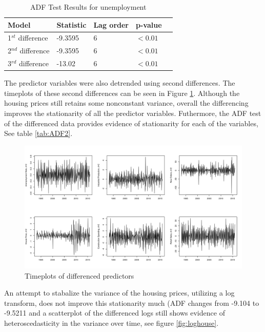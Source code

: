 \documentclass[twoside,twocolumn]{article}
\begin{document}
		 \begin{table}[htb]
		 \centering
		 \caption{ADF Test Results for unemployment}
		 \label{tab:ADF}
		 \begin{tabular}{lllll}
		 \hline
		 \textbf{Model} & \textbf{Statistic} & \textbf{Lag order} & \textbf{p-value}\\ \hline
		  1\(^{st}\) difference &  -9.3595 & 6 &\( < 0.01\)\\
		  2\(^{nd}\) difference &  -9.3595 & 6 & \( < 0.01\)\\			  
		  3\(^{rd}\) difference &  -13.02 & 6 & \( < 0.01\)\\		 \hline
		 \end{tabular}
		 \end{table}
The predictor variables were also detrended using second differences. The timeplots of these second differences can be seen in Figure \ref{fig:statpred}. Although the housing prices still retains some nonconstant variance, overall the differencing improves the stationarity of all the predictor variables.  Futhermore, the ADF test of the differenced data provides evidence of stationarity for each of the variables, See table \ref{tab:ADF2}. 

		\begin{figure}[htb]
		\centering
		\caption{Timeplots of differenced predictors}
		\label{fig:statpred}
		\includegraphics[width=\linewidth]{images/StationaryPred}
		\end{figure}

An attempt to stabalize the variance of the housing prices, utilizing a log transform, does not improve this stationarity much (ADF changes from -9.104 to -9.5211 and a scatterplot of the differenced logs still shows evidence of heteroscedasticity in the variance over time, see figure \ref{fig:loghouse}. 
\end{document}
